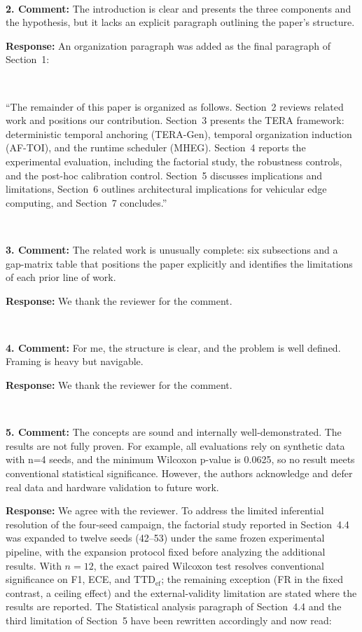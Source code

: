 \documentclass[1p,12pt,authoryear]{elsarticle}
\begin{document}
~

\noindent \textbf{2. Comment:} The introduction is clear and presents the three components and the hypothesis, but it lacks an explicit paragraph outlining the paper's structure.

\vspace{2mm}
\noindent \textbf{Response:} An organization paragraph was added as the final paragraph of Section~1:

~

``The remainder of this paper is organized as follows. Section~2 reviews related work and positions our contribution. Section~3 presents the TERA framework: deterministic temporal anchoring (TERA-Gen), temporal organization induction (AF-TOI), and the runtime scheduler (MHEG). Section~4 reports the experimental evaluation, including the factorial study, the robustness controls, and the post-hoc calibration control. Section~5 discusses implications and limitations, Section~6 outlines architectural implications for vehicular edge computing, and Section~7 concludes.''

~

\noindent \textbf{3. Comment:} The related work is unusually complete: six subsections and a gap-matrix table that positions the paper explicitly and identifies the limitations of each prior line of work.

\vspace{2mm}
\noindent \textbf{Response:} We thank the reviewer for the comment.

~

\noindent \textbf{4. Comment:} For me, the structure is clear, and the problem is well defined. Framing is heavy but navigable.

\vspace{2mm}
\noindent \textbf{Response:} We thank the reviewer for the comment.

~

\noindent \textbf{5. Comment:} The concepts are sound and internally well-demonstrated. The results are not fully proven. For example, all evaluations rely on synthetic data with n=4 seeds, and the minimum Wilcoxon p-value is 0.0625, so no result meets conventional statistical significance. However, the authors acknowledge and defer real data and hardware validation to future work.

\vspace{2mm}
\noindent \textbf{Response:} We agree with the reviewer. To address the limited inferential resolution of the four-seed campaign, the factorial study reported in Section~4.4 was expanded to twelve seeds (42--53) under the same frozen experimental pipeline, with the expansion protocol fixed before analyzing the additional results. With $n=12$, the exact paired Wilcoxon test resolves conventional significance on F1, ECE, and $\mathrm{TTD}_{\mathrm{ef}}$; the remaining exception (FR in the fixed contrast, a ceiling effect) and the external-validity limitation are stated where the results are reported. The Statistical analysis paragraph of Section~4.4 and the third limitation of Section~5 have been rewritten accordingly and now read:
\end{document}
